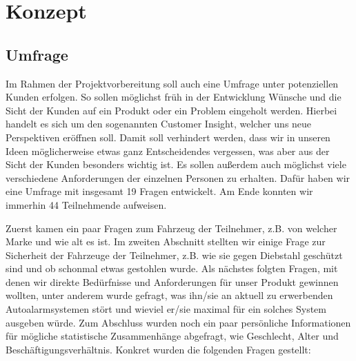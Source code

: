 \section{Konzept}
\subsection{Umfrage}
Im Rahmen der Projektvorbereitung soll auch eine Umfrage unter potenziellen Kunden erfolgen. So sollen möglichst früh in der Entwicklung Wünsche und die Sicht der Kunden auf ein Produkt oder ein Problem eingeholt werden. Hierbei handelt es sich um den sogenannten Customer Insight, welcher uns neue Perspektiven eröffnen soll. Damit soll verhindert werden, dass wir in unseren Ideen möglicherweise etwas ganz Entscheidendes vergessen, was aber aus der Sicht der Kunden besonders wichtig ist. Es sollen außerdem auch möglichst viele verschiedene Anforderungen der einzelnen Personen zu erhalten. Dafür haben wir eine Umfrage mit insgesamt 19 Fragen entwickelt. Am Ende konnten wir immerhin 44 Teilnehmende aufweisen.

Zuerst kamen ein paar Fragen zum Fahrzeug der Teilnehmer, z.B. von welcher Marke und wie alt es ist. Im zweiten Abschnitt stellten wir einige Frage zur Sicherheit der Fahrzeuge der Teilnehmer, z.B. wie sie gegen Diebstahl geschützt sind und ob schonmal etwas gestohlen wurde. Als nächstes folgten Fragen, mit denen wir direkte Bedürfnisse und Anforderungen für unser Produkt gewinnen wollten, unter anderem wurde gefragt, was ihn/sie an aktuell zu erwerbenden Autoalarmsystemen stört und wieviel er/sie maximal für ein solches System ausgeben würde. Zum Abschluss wurden noch ein paar persönliche Informationen für mögliche statistische Zusammenhänge abgefragt, wie Geschlecht, Alter und Beschäftigungsverhältnis.
Konkret wurden die folgenden Fragen gestellt:

